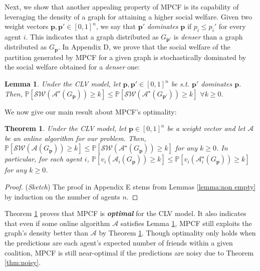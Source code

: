 \documentclass[letterpaper]{article}
\newtheorem{theorem}{Theorem}
\newtheorem{lemma}{Lemma}
\begin{document}
Next, we show that another appealing property of MPCF is its capability of leveraging the density of a graph for attaining a higher social welfare. Given two weight vectors $\mathbf{p}, \mathbf{p}' \in [0,1]^n$, we say that $\mathbf{p}'$ \textit{dominates} $\mathbf{p}$ if $p_i \leq p_i'$ for every agent $i$. This indicates that a graph distributed as ${G}_{\mathbf{p}'}$ is \textit{denser} than a graph distributed as ${G}_{\mathbf{p}}$. In Appendix D, we prove that the social welfare of the partition generated by MPCF for a given graph is stochastically dominated by the social welfare obtained for a \textit{denser} one:
\begin{lemma}
\label{lemma:dominates}
Under the CLV model, let $\mathbf{p}, \mathbf{p}' \in [0,1]^n$ be s.t. $\mathbf{p}'$ dominates $\mathbf{p}$. Then, $\mathbb{P}[\mathcal{SW}(\mathcal{A}^\star(G_{\mathbf{p}})) \geq k] \leq \mathbb{P}[\mathcal{SW}(\mathcal{A}^\star(G_{\mathbf{p}'})) \geq k]$ $\forall k \geq 0$.
\end{lemma}

We now give our main result about MPCF's optimality:

\begin{theorem}
\label{thm:MPCF is optimal}
Under the CLV model, let $\mathbf{p} \in [0,1]^n$ be a weight vector and let $\mathcal{A}$ be an online algorithm for our problem. Then, $\mathbb{P}[\mathcal{SW}(\mathcal{A}(G_{\mathbf{p}})) \geq k] \leq \mathbb{P}[\mathcal{SW}(\mathcal{A}^\star(G_{\mathbf{p}})) \geq k]$ for any $k \geq 0$. In particular, for each agent $i$, $\mathbb{P}[v_i(\mathcal{A}_i(G_{\mathbf{p}})) \geq k] \leq \mathbb{P}[v_i(\mathcal{A}^\star_i(G_{\mathbf{p}})) \geq k]$ for any $k \geq 0$.
\end{theorem}
\begin{proof}
(\textit{Sketch})
The proof in Appendix E stems from Lemmas \ref{lemma:non empty} by induction on the number of agents $n$.
\end{proof}

Theorem \ref{thm:MPCF is optimal} proves that MPCF is \textit{\textbf{optimal}} for the CLV model. It also indicates that even if some online algorithm $\mathcal{A}$ satisfies Lemma \ref{lemma:dominates}, MPCF still exploits the graph's density better than $\mathcal{A}$ by Theorem \ref{thm:MPCF is optimal}. Though optimality only holds when the predictions are each agent's expected number of friends within a given coalition, MPCF is still near-optimal if the predictions are noisy due to Theorem \ref{thm:noisy}.
\end{document}

